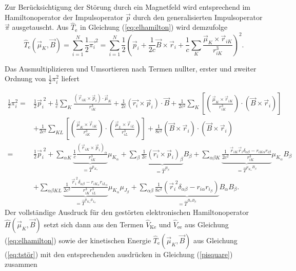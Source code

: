 	Zur Berücksichtigung der Störung durch ein Magnetfeld wird entsprechend im Hamiltonoperator der Impulsoperator $\vec{p}$ durch den generalisierten Impulsoperator $\vec{\pi}$ ausgetauscht. Aus $\hat{T}_\textrm{e}$ in Gleichung (\ref{eq:elhamilton}) wird demzufolge
	\begin{equation}\label{eq:tstör}
	\hat{T}_\textrm{e}(\vec{\mu}_K,\vec{B})=\sum_{i=1}^N\frac{1}{2}\vec{\pi_i}^2=\sum_{i=1}^N\frac{1}{2}\left(\vec{p}_i+\frac{1}{2c}\vec{B}\times \vec{r}_i +\frac{1}{c}\sum_K\frac{\vec{\mu}_K\times\vec{r}_{iK}}{r_{iK}^3}\right)^2.
	\end{equation}
	
	Das Ausmultiplizieren und Umsortieren nach Termen nullter, erster und zweiter Ordnung von $\frac{1}{2}\pi_i^2$ liefert
	
	\begin{equation}\label{pisquare}
	\begin{aligned}
	\frac{1}{2}\pi_i^2=&\frac{1}{2}\vec{p}_i^{\;2}+\frac{1}{c}\sum_K\frac{(\vec{r}_{iK}\times\vec{p}_{i})\cdot\vec{\mu}_K}{r_{iK}^3}+\frac{1}{2c}(\vec{r_i}\times \vec{p}_i)\cdot \vec{B}+ \frac{1}{2c^2}\sum_K\left[\left(\frac{\vec{\mu}_K\times\vec{r}_{iK}}{r_{iK}^3}\right)\cdot\left(\vec{B}\times\vec{r}_i\right)\right]\\
	&+\frac{1}{2c^2}\sum_{KL}\left[\left(\frac{\vec{\mu}_K\times\vec{r}_{iK}}{r_{iK}^3}\right)\cdot\left(\frac{\vec{\mu}_L\times\vec{r}_{iL}}{r_{iL}^3}\right)\right]+\frac{1}{8c^2}(\vec{B}\times\vec{r}_i)\cdot(\vec{B}\times\vec{r}_i) \\
	=&\frac{1}{2}\vec{p}_i^{\;2}+\sum_{\alpha K}\underbrace{\frac{1}{c}\frac{(\vec{r}_{iK}\times\vec{p}_{i})_\alpha}{r_{iK}^3}}_{=\hat{T}^{\mu_{K_\alpha}}}\mu_{K_\alpha}+\sum_\beta\underbrace{\frac{1}{2c}(\vec{r_i}\times \vec{p}_i)_\beta}_{=\hat{T}^{B_\beta}} B_\beta+\sum_{\alpha\beta K} \underbrace{\frac{1}{2c^2}\frac{\vec{r}_{iK}\vec{r}_{i}\delta_{\alpha\beta}-r_{iK\alpha}r_{i\beta}}{r_{iK}^3}}_{=\hat{T}^{\mu_{K_\alpha}B_\beta}}\mu_{K_\alpha}B_\beta\\
	&+\sum_{\alpha\beta KL}\underbrace{\frac{1}{2c^2}\frac{\vec{r}_i^{\; 2}\delta_{\alpha\beta}-r_{iK_\alpha}r_{iL_\beta}}{r_{iK}^3r_{iL}^3}}_{=\hat{T}^{\mu_{K_\alpha}\mu_{L_\beta}}}\mu_{K_\alpha}\mu_{J_\beta}+\sum_{\alpha\beta}\underbrace{\frac{1}{8c^2}\left(\vec{r}_i^{\; 2}\delta_{\alpha\beta}-r_{i\alpha}r_{i_\beta}\right)}_{=\hat{T}^{B_\alpha B_\beta}}B_\alpha B_\beta.
	\end{aligned}
	\end{equation}
	Der vollständige Ausdruck für den gestörten elektronischen Hamiltonoperator $\hat{H}(\vec{\mu}_K,\vec{B})$ setzt sich dann aus den Termen $\hat{V}_{\textrm{Ke}}$ und $\hat{V}_{\textrm{ee}}$ aus Gleichung (\ref{eq:elhamilton}) sowie der kinetischen Energie $\hat{T}_\textrm{e}(\vec{\mu}_K,\vec{B})$ aus Gleichung (\ref{eq:tstör}) mit den entsprechenden ausdrücken in Gleichung (\ref{pisquare}) zusammen
